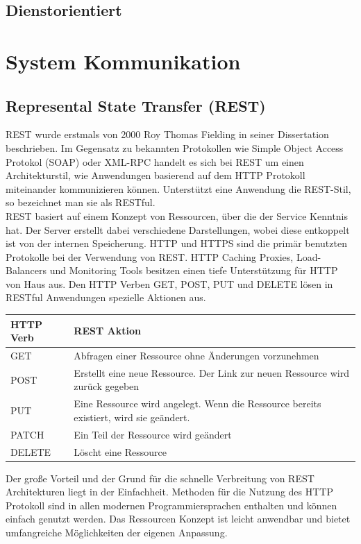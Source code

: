	
	
	\subsection{Dienstorientiert}

\section{System Kommunikation}
	\subsection{Represental State Transfer (REST)}
	REST wurde erstmals von 2000 Roy Thomas Fielding in seiner Dissertation beschrieben. Im Gegensatz zu bekannten Protokollen wie Simple Object Access Protokol (SOAP) oder XML-RPC handelt es sich bei REST um einen Architekturstil, wie Anwendungen basierend auf dem HTTP Protokoll miteinander kommunizieren können. Unterstützt eine Anwendung die REST-Stil, so bezeichnet man sie als RESTful.
	\cite[vgl.][]{Melzer.2010} \\
	REST basiert auf einem Konzept von Ressourcen, über die der Service Kenntnis hat. Der Server erstellt dabei verschiedene Darstellungen, wobei diese entkoppelt ist von der internen Speicherung.
	HTTP und HTTPS sind die primär benutzten Protokolle bei der Verwendung von REST. HTTP Caching Proxies, Load-Balancers und Monitoring Tools besitzen einen tiefe Unterstützung für HTTP von Haus aus.
	Den HTTP Verben GET, POST, PUT und DELETE lösen in RESTful Anwendungen spezielle Aktionen aus.
	\\
	
	\begin{tabular}{|p{3.5cm}|p{12.5cm}|}
	\hline 
	HTTP Verb & REST Aktion \\ 
	\hline 
	GET & Abfragen einer Ressource ohne Änderungen vorzunehmen \\ 
	\hline 
	POST & Erstellt eine neue Ressource. Der Link zur neuen Ressource wird zurück gegeben \\ 
	\hline 
	PUT & Eine Ressource wird angelegt. Wenn die Ressource bereits existiert, wird sie geändert. \\ 
	\hline 
	PATCH & Ein Teil der Ressource wird geändert \\ 
	\hline 
	DELETE & Löscht eine Ressource \\ 
	\hline 
	\end{tabular} 
	
	Der große Vorteil und der Grund für die schnelle Verbreitung von REST Architekturen liegt in der Einfachheit. Methoden für die Nutzung des HTTP Protokoll sind in allen modernen Programmiersprachen enthalten und können einfach genutzt werden. Das Ressourcen Konzept ist leicht anwendbar und bietet umfangreiche Möglichkeiten der eigenen Anpassung.
	
